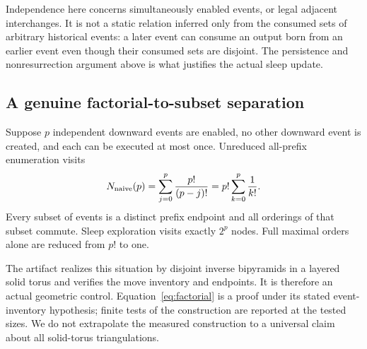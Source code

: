Independence here concerns simultaneously enabled events, or legal adjacent
interchanges. It is not a static relation inferred only from the consumed
sets of arbitrary historical events: a later event can consume an output
born from an earlier event even though their consumed sets are disjoint.
The persistence and nonresurrection argument above is what justifies the
actual sleep update.

\subsection{A genuine factorial-to-subset separation}

Suppose $p$ independent downward events are enabled, no other downward event
is created, and each can be executed at most once. Unreduced all-prefix
enumeration visits
\begin{equation}\label{eq:factorial}
 N_{\rm naive}(p)=\sum_{j=0}^{p}\frac{p!}{(p-j)!}
 =p!\sum_{k=0}^{p}\frac1{k!}.
\end{equation}
Every subset of events is a distinct prefix endpoint and all orderings of
that subset commute. Sleep exploration visits exactly $2^p$ nodes. Full
maximal orders alone are reduced from $p!$ to one.

The artifact realizes this situation by disjoint inverse bipyramids in a
layered solid torus and verifies the move inventory and endpoints. It is
therefore an actual geometric control. Equation~\eqref{eq:factorial} is a
proof under its stated event-inventory hypothesis; finite tests of the
construction are reported at the tested sizes. We do not extrapolate the
measured construction to a universal claim about all solid-torus
triangulations.
